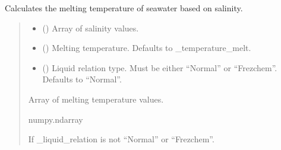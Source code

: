 \documentclass[a4paper,11pt,english,openany]{sphinxmanual}
\begin{document}

\begin{fulllineitems}
\label{\detokenize{api/spyice.update_physical_values:src.spyice.update_physical_values.calculate_melting_temperature_from_salinity}}
\pysigstartsignatures
\pysiglinewithargsret
{}
{\sphinxparamcomma {}\sphinxparamcomma {}}
{}
\pysigstopsignatures
\sphinxAtStartPar
Calculates the melting temperature of seawater based on salinity.
\begin{quote}\begin{description}
\begin{itemize}
\item {} 
\sphinxAtStartPar
{} () \textendash{} Array of salinity values.

\item {} 
\sphinxAtStartPar
{} (\sphinxstyleliteralemphasis{\sphinxupquote{, }}) \textendash{} Melting temperature. Defaults to \_temperature\_melt.

\item {} 
\sphinxAtStartPar
{} (\sphinxstyleliteralemphasis{\sphinxupquote{, }}) \textendash{} Liquid relation type. Must be either “Normal” or “Frezchem”. Defaults to “Normal”.

\end{itemize}

\sphinxAtStartPar
Array of melting temperature values.

\sphinxAtStartPar
numpy.ndarray

\sphinxAtStartPar
{} \textendash{} If \_liquid\_relation is not “Normal” or “Frezchem”.

\end{description}\end{quote}

\end{fulllineitems}
\end{document}

